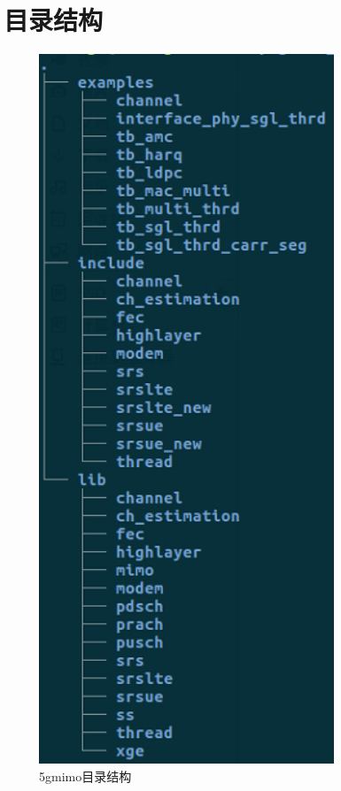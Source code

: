 \documentclass{article}
\begin{document}
\section{目录结构}
\begin{figure}[H]
	\centering
	\includegraphics[width = .4\textwidth]{5gmimo.png}
	\caption{5gmimo目录结构}
\end{figure}


\end{document}
